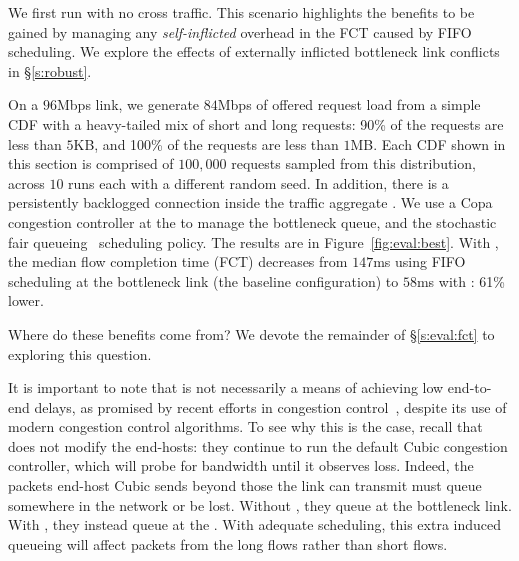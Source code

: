 We first run \name with no cross traffic.
This scenario highlights the benefits to be gained by managing any \emph{self-inflicted} overhead in the FCT caused by FIFO scheduling. 
We explore the effects of externally inflicted bottleneck link conflicts in \S\ref{s:robust}. 


On a $96$Mbps link, we generate $84$Mbps of offered request load from a simple  CDF with a heavy-tailed mix of short and long requests: 90\% of the requests are less than $5$KB, and 100\% of the requests are less than $1$MB. 
Each CDF shown in this section is comprised of $100,000$ requests sampled from this distribution, across $10$ runs each with a different random seed.
In addition, there is a persistently backlogged connection inside the traffic aggregate .
We use a Copa~\cite{copa} congestion controller at the \inbox to manage the bottleneck queue, and the stochastic fair queueing~\cite{sfq} scheduling policy. 
The results are in Figure~\ref{fig:eval:best}.
With \name, the median flow completion time (FCT) decreases from $147$ms using FIFO scheduling at the bottleneck link (the baseline configuration) to $58$ms with \name: 61\% lower.

Where do these benefits come from? We devote the remainder of \S\ref{s:eval:fct} to exploring this question.

 It is important to note that \name is not necessarily a means of achieving low end-to-end delays, as promised by recent efforts in congestion control~\cite{copa, nimbus}, despite its use of modern congestion control algorithms. 
To see why this is the case, recall that \name does not modify the end-hosts: they continue to run the default Cubic congestion controller, which will probe for bandwidth until it observes loss.
Indeed, the packets end-host Cubic sends beyond those the link can transmit must queue somewhere in the network or be lost. Without \name, they queue at the bottleneck link.
With \name, they instead queue at the \inbox.
With adequate scheduling, this extra induced queueing will affect packets from the long flows rather than short flows.

